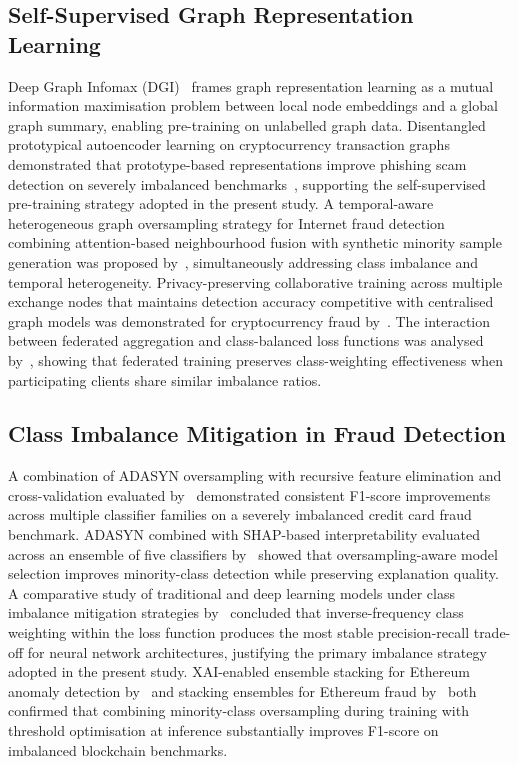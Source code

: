 \documentclass[12pt,a4paper]{article}
\begin{document}
\subsection{Self-Supervised Graph Representation Learning}

Deep Graph Infomax (DGI)~\citep{velickovic2019dgi} frames
graph representation learning as a mutual information
maximisation problem between local node embeddings and a
global graph summary, enabling pre-training on unlabelled
graph data. Disentangled prototypical autoencoder learning
on cryptocurrency transaction graphs demonstrated that
prototype-based representations improve phishing scam
detection on severely imbalanced
benchmarks~\citep{graphanomaly2024}, supporting the
self-supervised pre-training strategy adopted in the present
study. A temporal-aware heterogeneous graph oversampling
strategy for Internet fraud detection combining
attention-based neighbourhood fusion with synthetic minority
sample generation was proposed by~\citep{wei2025},
simultaneously addressing class imbalance and temporal
heterogeneity. Privacy-preserving collaborative training
across multiple exchange nodes that maintains detection
accuracy competitive with centralised graph models was
demonstrated for cryptocurrency fraud by~\citep{ahmed2024fed}.
The interaction between federated aggregation and
class-balanced loss functions was analysed
by~\citep{baabdullah2024}, showing that federated training
preserves class-weighting effectiveness when participating
clients share similar imbalance ratios.

\subsection{Class Imbalance Mitigation in Fraud Detection}

A combination of ADASYN oversampling with recursive feature
elimination and cross-validation evaluated
by~\citep{ileberi2024} demonstrated consistent F1-score
improvements across multiple classifier families on a
severely imbalanced credit card fraud benchmark. ADASYN
combined with SHAP-based interpretability evaluated across
an ensemble of five classifiers by~\citep{malhotra2025}
showed that oversampling-aware model selection improves
minority-class detection while preserving explanation
quality. A comparative study of traditional and deep learning
models under class imbalance mitigation strategies
by~\citep{albalawi2025} concluded that inverse-frequency
class weighting within the loss function produces the most
stable precision-recall trade-off for neural network
architectures, justifying the primary imbalance strategy
adopted in the present study. XAI-enabled ensemble stacking
for Ethereum anomaly detection by~\citep{chithanuru2025}
and stacking ensembles for Ethereum fraud
by~\citep{gu2025} both confirmed that combining
minority-class oversampling during training with threshold
optimisation at inference substantially improves F1-score
on imbalanced blockchain benchmarks.
\end{document}
